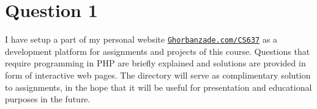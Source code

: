
\section*{Question 1}

I have setup a part of my personal website \href{http://ghorbanzade.com/cs637}{\texttt{Ghorbanzade.com/CS637}} as a development platform for assignments and projects of this course.
Questions that require programming in PHP are briefly explained and solutions are provided in form of interactive web pages.
The directory will serve as complimentary solution to assignments, in the hope that it will be useful for presentation and educational purposes in the future.

